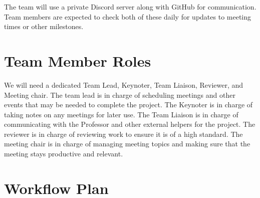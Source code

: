 \documentclass{article}
\begin{document}
The team will use a private Discord server along with GitHub for communication. 
Team members are expected to check both of these daily for updates to meeting 
times or other milestones.  

\section{Team Member Roles}

We will need a dedicated Team Lead, Keynoter, Team Liaison, Reviewer, and Meeting 
chair.
The team lead is in charge of scheduling meetings and other events that may be 
needed to complete the project. The Keynoter is in charge of taking notes on 
any meetings for later use. The Team Liaison is in charge of communicating with
 the Professor and other external helpers for the project. The reviewer is in
 charge of reviewing work to ensure it is of a high standard. The meeting chair 
 is in charge of managing meeting topics and making sure that the meeting stays
 productive and relevant. 

\section{Workflow Plan}

	
  
\end{document}
